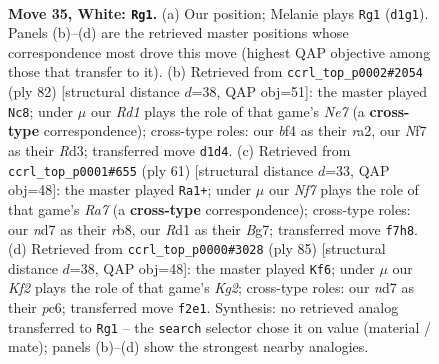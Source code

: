 \documentclass[11pt]{article}
\begin{document}
\clearpage

\begin{figure}[p]\centering
\begin{subfigure}{0.46\textwidth}\centering
\resizebox{\linewidth}{!}{%
\newchessgame
\chessboard[
  setfen={r1k3n1/3n1N2/8/6p1/4bb1p/1p5P/5KP1/3R4 w - - 0 35},
  showmover=false,
  pgfstyle=straightmove, color=movearrow, markmove={d1-g1}
]}
\caption{}
\end{subfigure}\hfill
\begin{subfigure}{0.46\textwidth}\centering
\resizebox{\linewidth}{!}{%
\newchessgame
\chessboard[
  setfen={8/4N1k1/3p2pp/4b3/8/3R2PP/r4P2/6K1 w - - 3 42},
  showmover=false,
  pgfstyle=straightmove, color=movearrow, markmove={e7-c8}
]}
\caption{}
\end{subfigure}
\\[4pt]
\begin{subfigure}{0.46\textwidth}\centering
\resizebox{\linewidth}{!}{%
\newchessgame
\chessboard[
  setfen={1R6/5pbk/2N1p3/7B/2n3P1/3n2B1/r4P2/6K1 b - - 4 31},
  showmover=false,
  pgfstyle=straightmove, color=movearrow, markmove={a2-a1}
]}
\caption{}
\end{subfigure}\hfill
\begin{subfigure}{0.46\textwidth}\centering
\resizebox{\linewidth}{!}{%
\newchessgame
\chessboard[
  setfen={8/3B2k1/p1PB4/P2n1p2/5P2/8/4K3/2r5 b - - 1 43},
  showmover=false,
  pgfstyle=straightmove, color=movearrow, markmove={g7-f6}
]}
\caption{}
\end{subfigure}
\caption{\textbf{Move 35, White: \texttt{Rg1}.} (a) Our position; Melanie plays \texttt{Rg1} (\texttt{d1g1}). Panels (b)--(d) are the retrieved master positions whose correspondence most drove this move (highest QAP objective among those that transfer to it). (b) Retrieved from \texttt{ccrl\_top\_p0002\#2054} (ply 82) [structural distance $d$=38, QAP obj=51]: the master played \texttt{Nc8}; under $\mu$ our \emph{Rd1} plays the role of that game's \emph{Ne7} (a \textbf{cross-type} correspondence); cross-type roles: our \emph{b}f4 as their \emph{r}a2, our \emph{N}f7 as their \emph{R}d3; transferred move \texttt{d1d4}. (c) Retrieved from \texttt{ccrl\_top\_p0001\#655} (ply 61) [structural distance $d$=33, QAP obj=48]: the master played \texttt{Ra1+}; under $\mu$ our \emph{Nf7} plays the role of that game's \emph{Ra7} (a \textbf{cross-type} correspondence); cross-type roles: our \emph{n}d7 as their \emph{r}b8, our \emph{R}d1 as their \emph{B}g7; transferred move \texttt{f7h8}. (d) Retrieved from \texttt{ccrl\_top\_p0000\#3028} (ply 85) [structural distance $d$=38, QAP obj=48]: the master played \texttt{Kf6}; under $\mu$ our \emph{Kf2} plays the role of that game's \emph{Kg2}; cross-type roles: our \emph{n}d7 as their \emph{p}c6; transferred move \texttt{f2e1}. Synthesis: no retrieved analog transferred to \texttt{Rg1} -- the \texttt{search} selector chose it on value (material / mate); panels (b)--(d) show the strongest nearby analogies.}
\label{fig:thought-m68}
\end{figure}
\end{document}
